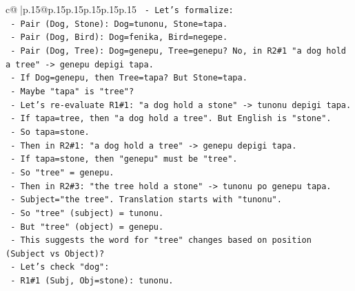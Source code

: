 \documentclass{article}
\begin{document}
{\begin{supertabular}{c@{$\;$}|p{.15\linewidth}@{}p{.15\linewidth}p{.15\linewidth}p{.15\linewidth}p{.15\linewidth}p{.15\linewidth}}
{{{\texttt{                                  {-} Let's formalize:} \\
\texttt{                                    {-} Pair (Dog, Stone): Dog=tunonu, Stone=tapa.} \\
\texttt{                                    {-} Pair (Dog, Bird): Dog=fenika, Bird=negepe.} \\
\texttt{                                    {-} Pair (Dog, Tree): Dog=genepu, Tree=genepu? No, in R2\#1 "a dog hold a tree" {-}> genepu depigi tapa.} \\
\texttt{                                      {-} If Dog=genepu, then Tree=tapa? But Stone=tapa.} \\
\texttt{                                      {-} Maybe "tapa" is "tree"?} \\
\texttt{                                      {-} Let's re{-}evaluate R1\#1: "a dog hold a stone" {-}> tunonu depigi tapa.} \\
\texttt{                                        {-} If tapa=tree, then "a dog hold a tree". But English is "stone".} \\
\texttt{                                        {-} So tapa=stone.} \\
\texttt{                                      {-} Then in R2\#1: "a dog hold a tree" {-}> genepu depigi tapa.} \\
\texttt{                                        {-} If tapa=stone, then "genepu" must be "tree".} \\
\texttt{                                        {-} So "tree" = genepu.} \\
\texttt{                                      {-} Then in R2\#3: "the tree hold a stone" {-}> tunonu po genepu tapa.} \\
\texttt{                                        {-} Subject="the tree". Translation starts with "tunonu".} \\
\texttt{                                        {-} So "tree" (subject) = tunonu.} \\
\texttt{                                        {-} But "tree" (object) = genepu.} \\
\texttt{                                        {-} This suggests the word for "tree" changes based on position (Subject vs Object)?} \\
\texttt{                                        {-} Let's check "dog":} \\
\texttt{                                          {-} R1\#1 (Subj, Obj=stone): tunonu.} \\
}}}
\end{supertabular}}
\end{document}
